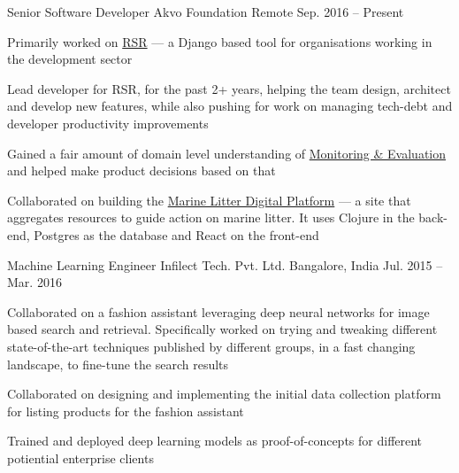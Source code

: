 

\begin{cventries}

  \cventry
      {Senior Software Developer} %
      {Akvo Foundation } %
      {Remote} %
      {Sep. 2016 -- Present} %
      {
        \begin{cvitems} %
        \item {Primarily worked on \href{https://github.com/akvo/akvo-rsr}{RSR} --- a Django based tool for organisations working in the development sector}
        \item {Lead developer for RSR, for the past 2+ years, helping the team design, architect and develop new features, while also pushing for work on managing tech-debt and developer productivity improvements}
        \item {Gained a fair amount of domain level understanding of \href{https://en.wikipedia.org/wiki/Monitoring_and_evaluation}{Monitoring \& Evaluation} and helped make product decisions based on that}
        \item {Collaborated on building the \href{https://digital.gpmarinelitter.org/}{Marine Litter Digital Platform} --- a site that aggregates resources to guide action on marine litter. It uses Clojure in the back-end, Postgres as the database and React on the front-end}
        \end{cvitems}
      }

  \cventry
    {Machine Learning Engineer} %
    {Infilect Tech. Pvt. Ltd. } %
    {Bangalore, India} %
    {Jul. 2015 -- Mar. 2016} %
    {
      \begin{cvitems} %
        \item{Collaborated on a fashion assistant leveraging deep neural networks for image based search and retrieval. Specifically worked on trying and tweaking different state-of-the-art techniques published by different groups, in a fast changing landscape, to fine-tune the search results}
        \item{Collaborated on designing and implementing the initial data collection platform for listing products for the fashion assistant}
        \item{Trained and deployed deep learning models as proof-of-concepts for different potiential enterprise clients}
      \end{cvitems}
    }


\end{cventries}

